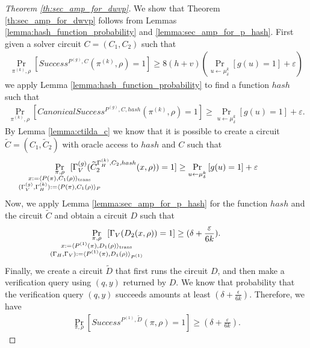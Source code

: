 \begin{proof}[Theorem \ref{th:sec_amp_for_dwvp}]
We show that Theorem \ref{th:sec_amp_for_dwvp} follows from Lemmas \ref{lemma:hash_function_probability} and \ref{lemma:sec_amp_for_p_hash}.
First given a solver circuit $C = (C_1, C_2)$ such that
\begin{align*}
    \underset{\pi^{(k)}, \rho}{\Pr}\left[Success^{P^{(g)}, C}(\pi^{(k)}, \rho) = 1\right] \geq 8(h+v)\left(\underset{u \leftarrow \mu_\delta^k}{\Pr}\left[g(u) = 1\right] + \varepsilon\right)
\end{align*}
we apply Lemma \ref{lemma:hash_function_probability} to find a function $hash$ such that
\begin{align*}
    \underset{\pi^{(k)}, \rho}{\Pr}\left[CanonicalSuccess^{P^{(g)}, C, hash}(\pi^{(k)}, \rho) = 1\right] \geq \underset{u \leftarrow \mu_\delta^k}{\Pr}\left[g(u) = 1\right] + \varepsilon.
\end{align*}
By Lemma \ref{lemma:ctilda_c} we know that it is possible to create a circuit $\widetilde{C} = (C_1, \widetilde{C}_2)$ with oracle access to $hash$ and $C$ such that
\begin{align*}
    \underset{
      \mathclap {
      \substack{\pi, \rho \\
        x := \langle P(\pi), C_1(\rho) \rangle_{\text{trans}} \\
        (\Gamma_V^{(g)}, \Gamma_H^{(k)}) := \langle P(\pi), C_1(\rho) \rangle_{P}
      }}}
    {\Pr}\mkern13mu[\Gamma_V^{(g)}(\widetilde{C}_2^{\Gamma_H^{(k)}, C_2, hash}(x, \rho)) = 1]
    \geq
\underset{u \leftarrow \mu_\delta^k}{\Pr}\left[g(u) = 1\right] + \varepsilon
\end{align*}
Now, we apply Lemma \ref{lemma:sec_amp_for_p_hash} for the function $hash$ and the circuit $\widetilde{C}$ and obtain a circuit $D$ such that
\begin{align}
  \label{eq:succ_prob_d}
    \underset{
      \mathclap{
      \substack{\pi, \rho \\ x := \langle P^{(1)}(\pi), D_1(\rho) \rangle_{\text{trans}} \\
        (\Gamma_H, \Gamma_V) := \langle P^{(1)}(\pi), D_1(\rho) \rangle_{P^{(1)}}}}}
    {\Pr}\mkern13mu[\Gamma_V(D_2(x, \rho)) = 1] \geq (\delta + \frac{\varepsilon}{6k}).
\end{align}
Finally, we create a circuit $\widetilde{D}$ that first runs the circuit $D$, and then make a verification
query using $(q,y)$ returned by $D$. We know that probability that the verification query $(q,y)$ succeeds
amounts at least $(\delta + \frac{\epsilon}{6k})$.
Therefore, we have
\begin{align*}
    \underset{\pi, \rho}{\Pr}\left[Success^{P^{(1)},\widetilde{D}}(\pi, \rho) = 1\right] \geq (\delta + \frac{\varepsilon}{6k}).
\end{align*}
\end{proof}

